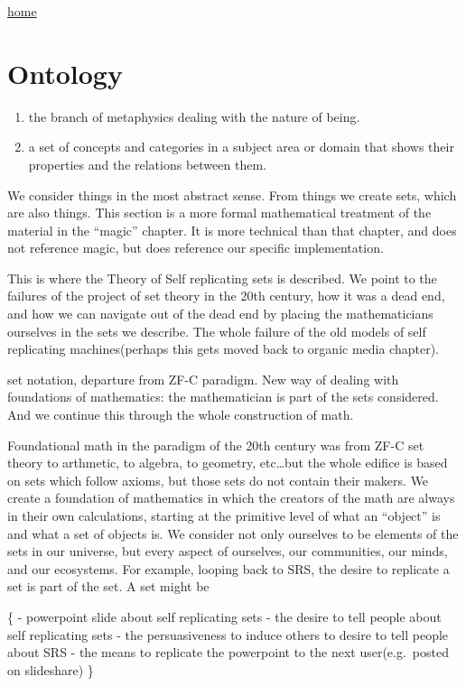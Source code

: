 \href{index.html}{home}

\section{Ontology}\label{ontology}

\begin{enumerate}
\def\labelenumi{\arabic{enumi}.}
\tightlist
\item
  the branch of metaphysics dealing with the nature of being.
\item
  a set of concepts and categories in a subject area or domain that
  shows their properties and the relations between them.
\end{enumerate}

We consider things in the most abstract sense. From things we create
sets, which are also things. This section is a more formal mathematical
treatment of the material in the ``magic'' chapter. It is more technical
than that chapter, and does not reference magic, but does reference our
specific implementation.

This is where the Theory of Self replicating sets is described. We point
to the failures of the project of set theory in the 20th century, how it
was a dead end, and how we can navigate out of the dead end by placing
the mathematicians ourselves in the sets we describe. The whole failure
of the old models of self replicating machines(perhaps this gets moved
back to organic media chapter).

set notation, departure from ZF-C paradigm. New way of dealing with
foundations of mathematics: the mathematician is part of the sets
considered. And we continue this through the whole construction of math.

Foundational math in the paradigm of the 20th century was from ZF-C set
theory to arthmetic, to algebra, to geometry, etc\ldots{}but the whole
edifice is based on sets which follow axioms, but those sets do not
contain their makers. We create a foundation of mathematics in which the
creators of the math are always in their own calculations, starting at
the primitive level of what an ``object'' is and what a set of objects
is. We consider not only ourselves to be elements of the sets in our
universe, but every aspect of ourselves, our communities, our minds, and
our ecosystems. For example, looping back to SRS, the desire to
replicate a set is part of the set. A set might be

\{ - powerpoint slide about self replicating sets - the desire to tell
people about self replicating sets - the persuasiveness to induce others
to desire to tell people about SRS - the means to replicate the
powerpoint to the next user(e.g.~posted on slideshare) \}

